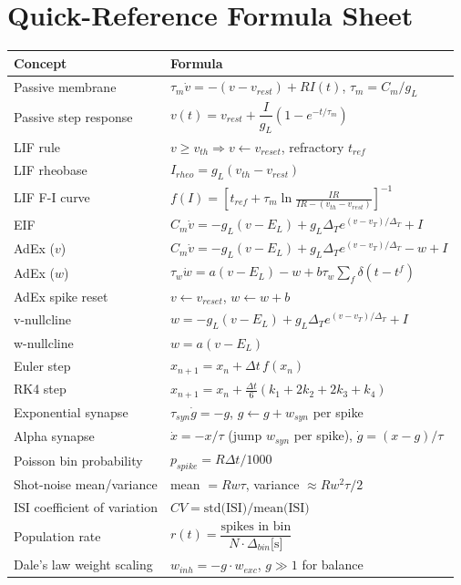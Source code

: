 \documentclass[11pt,a4paper]{article}
\begin{document}
\section{Quick-Reference Formula Sheet}
\begin{center}
\renewcommand{\arraystretch}{1.35}
\begin{longtable}{@{}p{3.6cm}p{12.5cm}@{}}
\toprule
\textbf{Concept} & \textbf{Formula} \\
\midrule
\endhead
Passive membrane & $\tau_m \dot v = -(v-v_{rest}) + RI(t)$, \quad $\tau_m = C_m/g_L$ \\
Passive step response & $v(t) = v_{rest} + \dfrac{I}{g_L}\left(1-e^{-t/\tau_m}\right)$ \\
LIF rule & $v\!\ge\! v_{th} \Rightarrow v\!\leftarrow\! v_{reset}$, refractory $t_{ref}$ \\
LIF rheobase & $I_{rheo} = g_L(v_{th}-v_{rest})$ \\
LIF F-I curve & $f(I) = \left[t_{ref} + \tau_m \ln\!\frac{IR}{IR-(v_{th}-v_{rest})}\right]^{-1}$ \\
EIF & $C_m \dot v = -g_L(v-E_L) + g_L\Delta_T e^{(v-v_T)/\Delta_T} + I$ \\
AdEx ($v$) & $C_m \dot v = -g_L(v-E_L) + g_L\Delta_T e^{(v-v_T)/\Delta_T} - w + I$ \\
AdEx ($w$) & $\tau_w \dot w = a(v-E_L) - w + b\tau_w\sum_f \delta(t-t^f)$ \\
AdEx spike reset & $v\!\leftarrow\! v_{reset}$, \quad $w \leftarrow w + b$ \\
v-nullcline & $w = -g_L(v-E_L) + g_L\Delta_T e^{(v-v_T)/\Delta_T} + I$ \\
w-nullcline & $w = a(v-E_L)$ \\
Euler step & $x_{n+1} = x_n + \Delta t\, f(x_n)$ \\
RK4 step & $x_{n+1} = x_n + \frac{\Delta t}{6}(k_1+2k_2+2k_3+k_4)$ \\
Exponential synapse & $\tau_{syn}\dot g = -g$, \; $g \leftarrow g+w_{syn}$ per spike \\
Alpha synapse & $\dot x = -x/\tau$ (jump $w_{syn}$ per spike), \; $\dot g = (x-g)/\tau$ \\
Poisson bin probability & $p_{spike} = R\Delta t / 1000$ \\
Shot-noise mean/variance & mean $=Rw\tau$, \; variance $\approx Rw^2\tau/2$ \\
ISI coefficient of variation & $CV = \text{std(ISI)}/\text{mean(ISI)}$ \\
Population rate & $r(t) = \dfrac{\text{spikes in bin}}{N\cdot\Delta_{bin}\text{[s]}}$ \\
Dale's law weight scaling & $w_{inh} = -g\cdot w_{exc}$, \; $g \gg 1$ for balance \\
\bottomrule
\end{longtable}
\end{center}
\end{document}
